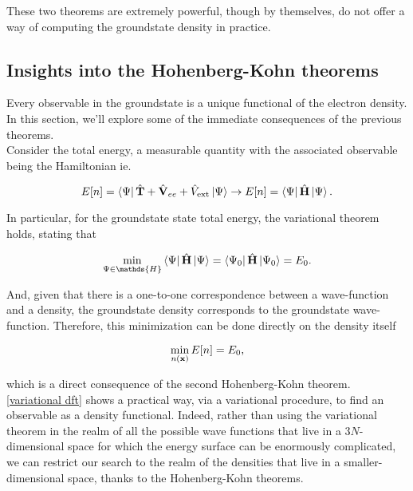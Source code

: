\documentclass{homework}
\begin{document}
These two theorems are extremely powerful, though by themselves, do not offer a way of computing the groundstate density in practice. \\

\subsection{Insights into the Hohenberg-Kohn theorems}

Every observable in the groundstate is a unique functional of the electron density. In this section, we'll explore some of the immediate consequences of the previous theorems. \\

Consider the total energy, a measurable quantity with the associated observable being the Hamiltonian ie. 

\begin{equation}
    E[n] = \bra{\Psi} \hat{\bf T}+\hat{\bf V}_{ee}+\hat{V}_{\textnormal{ext}}\ket{\Psi} \rightarrow  E[n] = \bra{\Psi} \hat{\bf H}\ket{\Psi}.
    \label{total energy functional}
\end{equation}

In particular, for the groundstate state total energy, the variational theorem holds, stating that 

\begin{equation}
    \min_{\Psi \in \mathds{H}} \bra{\Psi} \hat{\bf H}\ket{\Psi} =  \bra{\Psi_0} \hat{\bf H}\ket{\Psi_0} = E_0.
\end{equation}

And, given that there is a one-to-one correspondence between a wave-function and a density, the groundstate density corresponds to the groundstate wave-function. Therefore, this minimization can be done directly on the density itself 

\begin{equation}
\min_{n({\bf x})} E[n] = E_0,
\label{variational dft}    
\end{equation}

which is a direct consequence of the second Hohenberg-Kohn theorem. \eqref{variational dft} shows a practical way, via a variational procedure, to find an observable as a density functional. Indeed, rather than using the variational theorem in the realm of all the possible wave functions that live in a $3N$-dimensional space for which the energy surface can be enormously complicated, we can restrict our search to the realm of the densities that live in a smaller-dimensional space, thanks to the Hohenberg-Kohn theorems. \\
\end{document}
